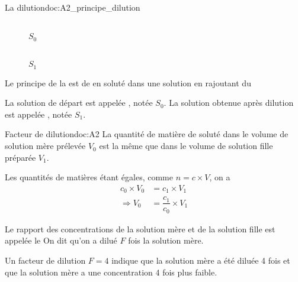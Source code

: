 

\newpage
\vspace*{-36pt}
\begin{doc}{La dilution}{doc:A2_principe_dilution}
  \begin{wrapfigure}[5]{r}{0.5\linewidth}
    \vspace*{-48pt}
    \centering
    \begin{multicols}{4}
     \\[-12pt]
    \footnotesize{$S_0$}
    
    
    
     \\[-12pt]
    \footnotesize{$S_1$}
    \end{multicols}
  \end{wrapfigure}
  \vAligne{-40pt}
  
  \begin{encart}
    Le principe de la  est de  en soluté dans une solution en rajoutant du 
  \end{encart}
  La solution de départ est appelée , notée $S_0$.
  La solution obtenue après dilution est appelée , notée $S_1$.
\end{doc}

\begin{doc}{Facteur de dilution}{doc:A2}
  La quantité de matière de soluté dans le volume de solution mère prélevée $V_0$ est la même que dans le volume de solution fille préparée $V_1$.
  
  Les quantités de matières étant égales, comme $n = c \times V$, on a
  \begin{align*}
    c_0 \times V_0 &= c_1 \times V_1 \\
    \Longrightarrow V_0 &= \dfrac{c_1}{c_0} \times V_1
  \end{align*}

  \begin{encart}  
    Le rapport des concentrations de la solution mère et de la solution fille est appelée le 
    On dit qu'on a dilué $F$ fois la solution mère.
  \end{encart}
  \exemple Un facteur de dilution $F = 4$ indique que la solution mère a été diluée 4 fois et que la solution mère a une concentration 4 fois plus faible.
\end{doc}

